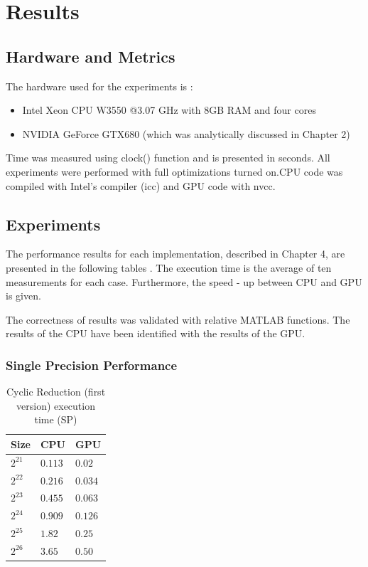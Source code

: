 
\chapter{Results}
\section{Hardware and Metrics}
The hardware used for the experiments is :\begin{itemize}
  \item Intel Xeon CPU W3550 @3.07 GHz with 8GB RAM and four cores
  \item NVIDIA GeForce GTX680 (which was analytically discussed in Chapter 2)
\end{itemize}Time was measured using clock() function and is presented in seconds.
All experiments were performed with full optimizations turned on.CPU code was compiled with Intel's compiler (icc) and GPU code with nvcc.
\section{Experiments}
The performance results for each implementation, described in Chapter 4, are presented in the following tables . The execution time is the average of ten measurements for each case. Furthermore, the speed - up between CPU and GPU is given.

The correctness of results was validated with relative MATLAB functions. The results of the CPU have been identified with the results of the GPU.
\newpage
\subsection{Single Precision Performance}


  

\begin{table}[H]
\caption{Cyclic Reduction (first version) execution time (SP)} 
\centering 
\begin{tabular}{| l | p{3cm} | p{3cm} |} 
\hline\hline 
Size & CPU & GPU  \\ [0.8ex] 
\hline 
$2^{21}$ & $0.113$ & $0.02$\\ 
$2^{22}$ & $0.216$ & $0.034$\\
$2^{23}$ & $0.455$ & $0.063$\\
$2^{24}$ & $0.909$ & $0.126$\\
$2^{25}$ & $1.82$ & $0.25$ \\ 
$2^{26}$ & $3.65$ & $0.50$ \\[1ex] 
\hline 
\end{tabular}
\label{table:cr_first} 
\end{table}

